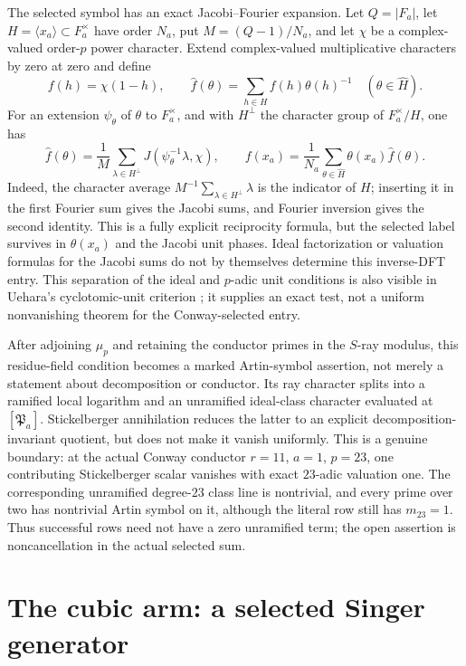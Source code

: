 \documentclass[11pt]{article}
\theoremstyle{definition}
\theoremstyle{remark}
\begin{document}
The selected symbol has an exact Jacobi--Fourier expansion.  Let
$Q=|F_a|$, let $H=\langle x_a\rangle\subset F_a^\times$ have order $N_a$,
put $M=(Q-1)/N_a$, and let $\chi$ be a complex-valued order-$p$ power
character.  Extend complex-valued multiplicative characters by zero at zero
and define
\[
 f(h)=\chi(1-h),\qquad
 \widehat f(\theta)=\sum_{h\in H}f(h)\theta(h)^{-1}
 \quad(\theta\in\widehat H).
\]
For an extension $\psi_\theta$ of $\theta$ to $F_a^\times$, and with
$H^\perp$ the character group of $F_a^\times/H$, one has
\[
 \widehat f(\theta)
 =\frac1M\sum_{\lambda\in H^\perp}
 J(\psi_\theta^{-1}\lambda,\chi),
 \qquad
 f(x_a)=\frac1{N_a}\sum_{\theta\in\widehat H}
 \theta(x_a)\widehat f(\theta).
\]
Indeed, the character average
$M^{-1}\sum_{\lambda\in H^\perp}\lambda$ is the indicator of $H$;
inserting it in the first Fourier sum gives the Jacobi sums, and Fourier
inversion gives the second identity.  This is a fully explicit reciprocity
formula, but the selected label survives in $\theta(x_a)$ and the Jacobi
unit phases.  Ideal factorization or valuation formulas for the Jacobi sums
do not by themselves determine this inverse-DFT entry.  This separation of
the ideal and $p$-adic unit conditions is also visible in Uehara's
cyclotomic-unit criterion \cite{uehara1985}; it supplies an exact test, not a
uniform nonvanishing theorem for the Conway-selected entry.

After adjoining $\mu_p$ and retaining the conductor primes in the $S$-ray
modulus, this residue-field condition becomes a marked Artin-symbol
assertion, not merely a statement about decomposition or conductor.  Its
ray character splits into a ramified local logarithm and an unramified
ideal-class character evaluated at $[\mathfrak P_a]$.  Stickelberger
annihilation reduces the latter to an explicit decomposition-invariant
quotient, but does not make it vanish uniformly.  This is a genuine boundary:
at the actual Conway conductor
$r=11$, $a=1$, $p=23$, one contributing Stickelberger scalar vanishes with
exact $23$-adic valuation one.  The corresponding unramified degree-$23$
class line is nontrivial, and every prime over two has nontrivial Artin symbol
on it, although the literal row still has $m_{23}=1$.  Thus successful rows
need not have a zero unramified term; the open assertion is noncancellation in
the actual selected sum.

\section{The cubic arm: a selected Singer generator}\label{sec:c}
\end{document}
